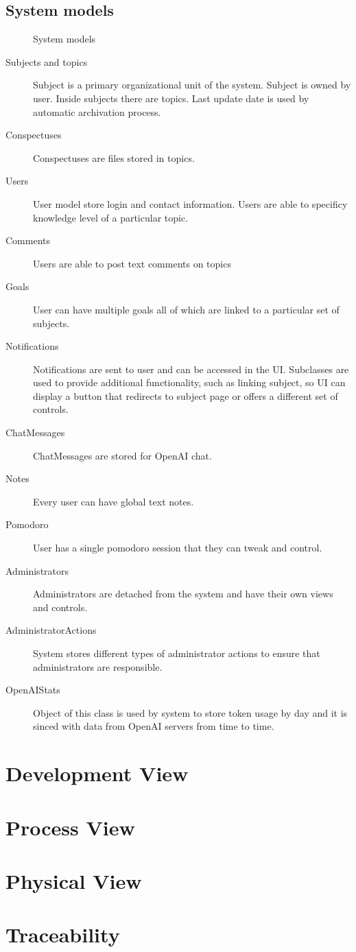 \documentclass[
    english, %
]{VUMIFPSkursinis}
\begin{document}
\subsection{System models}

\begin{figure}[ht]
    \centering
    
    \label{system-models}
    \caption{System models}
\end{figure}

\begin{description}
    \item[Subjects and topics] Subject is a primary organizational unit of the system. Subject is owned by user. Inside subjects there are topics. Last update date is used by automatic archivation process.
    \item[Conspectuses] Conspectuses are files stored in topics.
    \item[Users] User model store login and contact information. Users are able to specificy knowledge level of a particular topic.
    \item[Comments] Users are able to post text comments on topics
    \item[Goals] User can have multiple goals all of which are linked to a particular set of subjects.
    \item[Notifications] Notifications are sent to user and can be accessed in the UI. Subclasses are used to provide additional functionality, such as linking subject, so UI can display a button that redirects to subject page or offers a different set of controls.
    \item[ChatMessages] ChatMessages are stored for OpenAI chat.
    \item[Notes] Every user can have global text notes.
    \item[Pomodoro] User has a single pomodoro session that they can tweak and control.
    \item[Administrators] Administrators are detached from the system and have their own views and controls.
    \item[AdministratorActions] System stores different types of administrator actions to ensure that administrators are responsible.
    \item[OpenAIStats] Object of this class is used by system to store token usage by day and it is sinced with data from OpenAI servers from time to time.
\end{description}

\section{Development View}

\section{Process View}

\section{Physical View}

\section{Traceability}

\listoffigures
\printbibliography[heading=bibintoc]
\end{document}
